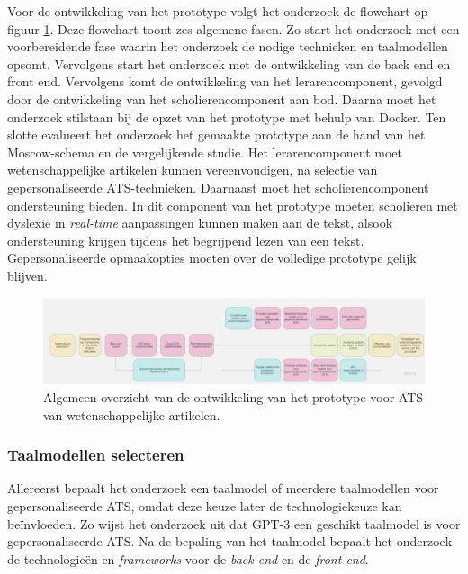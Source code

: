 Voor de ontwikkeling van het prototype volgt het onderzoek de flowchart op figuur \ref{img:general-overview-prototype}. Deze flowchart toont zes algemene fasen. Zo start het onderzoek met een voorbereidende fase waarin het onderzoek de nodige technieken en taalmodellen opsomt. Vervolgens start het onderzoek met de ontwikkeling van de back end en front end. Vervolgens komt de ontwikkeling van het lerarencomponent, gevolgd door de ontwikkeling van het scholierencomponent aan bod. Daarna moet het onderzoek stilstaan bij de opzet van het prototype met behulp van Docker. Ten slotte evalueert het onderzoek het gemaakte prototype aan de hand van het Moscow-schema en de vergelijkende studie. Het lerarencomponent moet wetenschappelijke artikelen kunnen vereenvoudigen, na selectie van gepersonaliseerde ATS-technieken. Daarnaast moet het scholierencomponent ondersteuning bieden. In dit component van het prototype moeten scholieren met dyslexie in \textit{real-time} aanpassingen kunnen maken aan de tekst, alsook ondersteuning krijgen tijdens het begrijpend lezen van een tekst. Gepersonaliseerde opmaakopties moeten over de volledige prototype gelijk blijven.

\begin{figure}[H]
	\includegraphics[width=\linewidth]{img/flowchart-general-development.jpg}
	\caption{Algemeen overzicht van de ontwikkeling van het prototype voor ATS van wetenschappelijke artikelen.}
	\label{img:general-overview-prototype}
\end{figure}

\subsubsection{Taalmodellen selecteren}

Allereerst bepaalt het onderzoek een taalmodel of meerdere taalmodellen voor gepersonaliseerde ATS, omdat deze keuze later de technologiekeuze kan beïnvloeden. Zo wijst het onderzoek uit dat GPT-3 een geschikt taalmodel is voor gepersonaliseerde ATS. Na de bepaling van het taalmodel bepaalt het onderzoek de technologieën en \textit{frameworks} voor de \textit{back end} en de \textit{front end}. 

